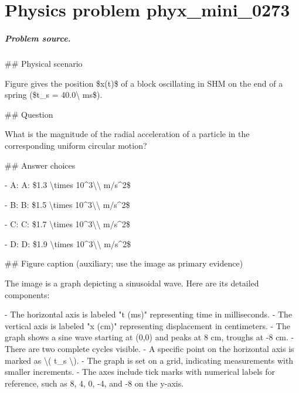 
\chapter{Physics problem phyx\_mini\_0273}
\label{ch:PhyXMiniProblems_problem_phyx_mini_0273}

\paragraph{Problem source.}
\#\# Physical scenario

Figure gives the position \$x(t)\$ of a block oscillating in SHM on the end of a spring (\$t\_s = 40.0\textbackslash{} ms\$).

\#\# Question

What is the magnitude of the radial acceleration of a particle in the corresponding uniform circular motion?

\#\# Answer choices

- A: A: \$1.3 \textbackslash{}times 10\textasciicircum{}3\textbackslash{}\textbackslash{} m/s\textasciicircum{}2\$

- B: B: \$1.5 \textbackslash{}times 10\textasciicircum{}3\textbackslash{}\textbackslash{} m/s\textasciicircum{}2\$

- C: C: \$1.7 \textbackslash{}times 10\textasciicircum{}3\textbackslash{}\textbackslash{} m/s\textasciicircum{}2\$

- D: D: \$1.9 \textbackslash{}times 10\textasciicircum{}3\textbackslash{}\textbackslash{} m/s\textasciicircum{}2\$

\#\# Figure caption (auxiliary; use the image as primary evidence)

The image is a graph depicting a sinusoidal wave. Here are its detailed components:

- The horizontal axis is labeled "t (ms)" representing time in milliseconds.
- The vertical axis is labeled "x (cm)" representing displacement in centimeters.
- The graph shows a sine wave starting at (0,0) and peaks at 8 cm, troughs at -8 cm.
- There are two complete cycles visible.
- A specific point on the horizontal axis is marked as \textbackslash{}( t\_s \textbackslash{}).
- The graph is set on a grid, indicating measurements with smaller increments.
- The axes include tick marks with numerical labels for reference, such as 8, 4, 0, -4, and -8 on the y-axis.

